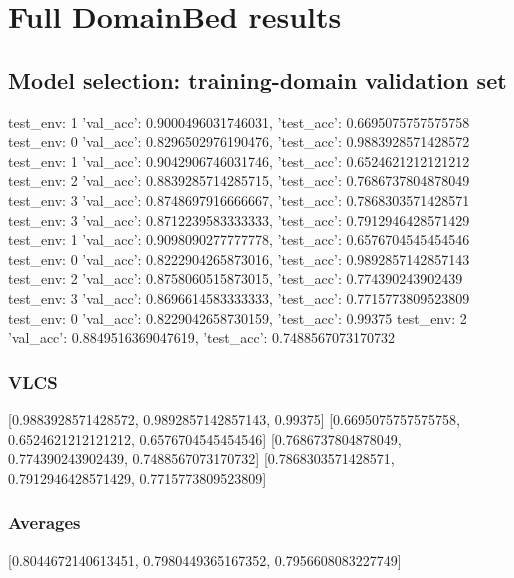 \documentclass{article}
\begin{document}
\section{Full DomainBed results}

\subsection{Model selection: training-domain validation set}
test_env: 1
{'val_acc': 0.9000496031746031, 'test_acc': 0.6695075757575758}
test_env: 0
{'val_acc': 0.8296502976190476, 'test_acc': 0.9883928571428572}
test_env: 1
{'val_acc': 0.9042906746031746, 'test_acc': 0.6524621212121212}
test_env: 2
{'val_acc': 0.8839285714285715, 'test_acc': 0.7686737804878049}
test_env: 3
{'val_acc': 0.8748697916666667, 'test_acc': 0.7868303571428571}
test_env: 3
{'val_acc': 0.8712239583333333, 'test_acc': 0.7912946428571429}
test_env: 1
{'val_acc': 0.9098090277777778, 'test_acc': 0.6576704545454546}
test_env: 0
{'val_acc': 0.8222904265873016, 'test_acc': 0.9892857142857143}
test_env: 2
{'val_acc': 0.8758060515873015, 'test_acc': 0.774390243902439}
test_env: 3
{'val_acc': 0.8696614583333333, 'test_acc': 0.7715773809523809}
test_env: 0
{'val_acc': 0.8229042658730159, 'test_acc': 0.99375}
test_env: 2
{'val_acc': 0.8849516369047619, 'test_acc': 0.7488567073170732}

\subsubsection{VLCS}
[0.9883928571428572, 0.9892857142857143, 0.99375]
[0.6695075757575758, 0.6524621212121212, 0.6576704545454546]
[0.7686737804878049, 0.774390243902439, 0.7488567073170732]
[0.7868303571428571, 0.7912946428571429, 0.7715773809523809]

\begin{center}
\end{center}

\subsubsection{Averages}
[0.8044672140613451, 0.7980449365167352, 0.7956608083227749]

\begin{center}
\end{center}
\end{document}
